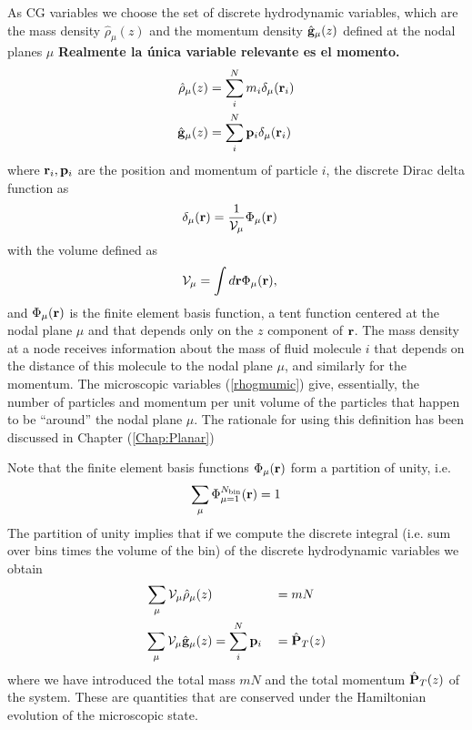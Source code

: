 \documentclass[b5paper,openright,11pt]{book}
\newcommand{\Note}[1]{{\bf \color{red}#1}}    %
\begin{document}
As CG variables we choose  the set of discrete hydrodynamic
variables,  which are  the  mass density  $\hat{\rho}_\mu(z)$ and  the
momentum  density $\hat{\bf  g}_\mu(z)$  defined at  the nodal  planes
$\mu$   \Note{Realmente la única variable relevante es el momento.}
\begin{align}
\hat{\rho}_\mu(z)&= \sum_i^Nm_i\delta_\mu({\bf r}_i)
\nonumber\\
\hat{\bf g}_\mu(z)&= \sum_i^N{\bf p}_i\delta_\mu({\bf r}_i)
\end{align}
where ${\bf r}_i,{\bf p}_i$ are the position and momentum of particle $i$, 
 the discrete Dirac delta function as 
\begin{align}
\delta_\mu({\bf r})&=  \frac{1}{{\cal V}_\mu}\Phi_\mu({\bf r})
\label{delta}
\end{align}
with the volume defined as
\begin{align}
  {\cal V}_\mu&=\int d{\bf r}\Phi_\mu({\bf r}),
\end{align}
and $\Phi_\mu({\bf r})$  is the finite element basis  function, a tent
function centered  at the nodal plane  $\mu$ and that depends  only on
the $z$ component  of ${\bf r}$.  The mass density  at a node receives
information about the  mass of fluid molecule $i$ that  depends on the
distance of this molecule to the  nodal plane $\mu$, and similarly for
the  momentum.   The  microscopic  variables  (\ref{rhogmumic})  give,
essentially, the number  of particles and momentum per  unit volume of
the particles that happen to be ``around'' the nodal plane $\mu$.  The rationale for using this definition has been discussed in Chapter (\ref{Chap:Planar})


Note that the finite  element basis  functions $\Phi_\mu({\bf  r})$  form a
partition of unity, i.e.
\begin{align}
  \sum_\mu\Phi_{\mu=1}^{N_{\rm bin}}({\bf r})=1
\label{PartUnit}
\end{align}
The  partition  of unity  implies  that  if  we compute  the  discrete
integral  (i.e. sum  over bins  times the  volume of  the bin)  of the
discrete hydrodynamic variables we obtain
\begin{align}
  \sum_\mu{\cal V}_\mu\hat{\rho}_\mu(z)&  &&= mN
\nonumber\\
  \sum_\mu{\cal V}_\mu\hat{\bf g}_\mu(z)&=\sum_i^N{\bf p}_i&&= \hat{\bf P}_T(z)
\label{DiscCons}
\end{align}
where we  have introduced the total  mass $mN$ and the  total momentum
$\hat{\bf  P}_T(z)$ of  the  system.  These  are  quantities that  are
conserved under  the Hamiltonian  evolution of the  microscopic state.
\end{document}
